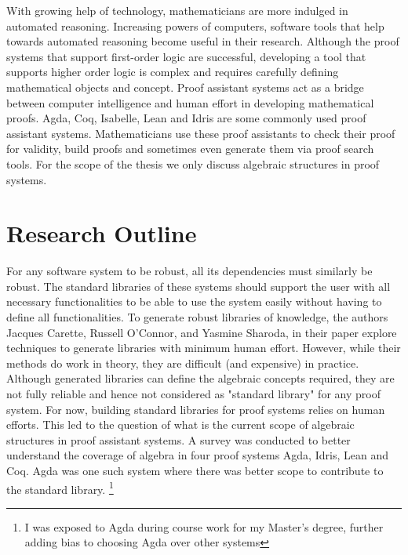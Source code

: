 With growing help of technology, mathematicians are more indulged in automated
reasoning. Increasing powers of computers, software tools that help towards
automated reasoning become useful in their research. Although the proof systems
that support first-order logic are successful, developing a tool that supports
higher order logic is complex \cite{phillips2010automated} and requires
carefully defining mathematical objects and concept. Proof assistant systems act
as a bridge between computer intelligence and human effort in developing
mathematical proofs. Agda, Coq, Isabelle, Lean and Idris are some commonly used
proof assistant systems. Mathematicians use these proof assistants to check their
proof for validity, build proofs and sometimes even generate them via proof
search tools.  For the scope of the thesis we only discuss algebraic
structures in proof systems.

\section{Research Outline}
For any software system to be robust, all its dependencies must similarly be
robust. The standard libraries of these systems should support the user with all
necessary functionalities to be able to use the system easily without having to
define all functionalities. To generate robust libraries of knowledge, the
authors Jacques Carette, Russell O'Connor, and Yasmine Sharoda, in their paper
\cite{BuildingDiamond} explore techniques to generate libraries with minimum
human effort. However, while their methods do work in theory, they are
difficult (and expensive) in practice. Although generated libraries can define
the algebraic concepts required, they are not fully reliable and hence not
considered as "standard library" for any proof system. For now, building
standard libraries for proof systems relies on human efforts. This led to the
question of what is the current scope of algebraic structures in proof
assistant systems. A survey was conducted to better understand the coverage of
algebra in four proof systems Agda, Idris, Lean and Coq. Agda was one such
system where there was better scope to contribute to the standard library.
\footnote{I was exposed to Agda during course work for my Master's degree,
further adding bias to choosing Agda over other systems} 

